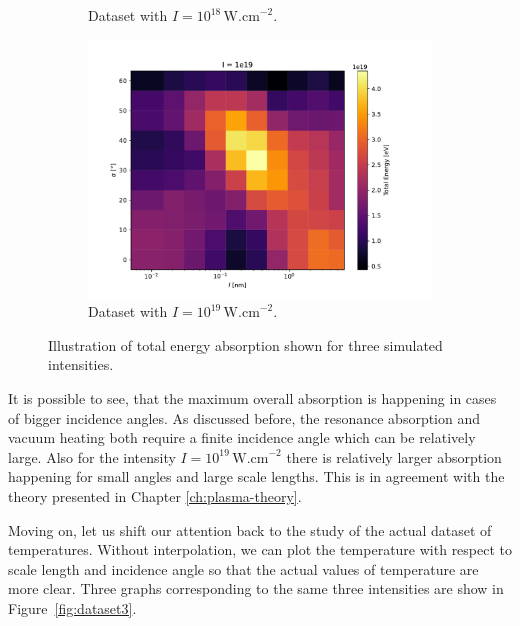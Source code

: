 \begin{figure}[ht]
\begin{subfigure}{0.49\textwidth}
		\caption{Dataset with $I =10^{18} \, \mathrm{W.cm}^{-2}$.}
		\label{fig:datset2-b}
	\end{subfigure}
	\begin{subfigure}{0.49\textwidth}
		\centering
		\includegraphics[width=\textwidth]{figures/I_1e19_cut_10}
		\caption{Dataset with $I = 10^{19} \, \mathrm{W.cm}^{-2}$.}
		\label{fig:dataset2-c}
	\end{subfigure}
	\caption{Illustration of total energy absorption shown for three simulated intensities.}
	\label{fig:dataset2}
\end{figure}

It is possible to see, that the maximum overall absorption is happening in cases of bigger incidence angles. As discussed before, the resonance absorption and vacuum heating both require a finite incidence angle which can be relatively large. Also for the intensity $I = 10^{19} \, \mathrm{W.cm}^{-2}$ there is relatively larger absorption happening for small angles and large scale lengths. This is in agreement with the theory presented in Chapter \ref{ch:plasma-theory}.

Moving on, let us shift our attention back to the study of the actual dataset of temperatures. Without interpolation, we can plot the temperature with respect to scale length and incidence angle so that the actual values of temperature are more clear. Three graphs corresponding	 to the same three intensities are show in Figure~\ref{fig:dataset3}.

